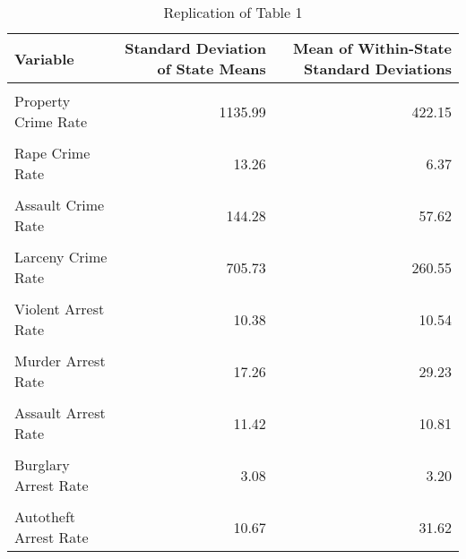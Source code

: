 \begin{table}[H]

\caption{\label{tab:tab:replicatetable2}Replication of Table 1}
\centering
\begin{tabular}[t]{lrr}
\toprule
Variable & Standard Deviation of State Means & Mean of Within-State Standard Deviations\\
\midrule
\cellcolor{gray!6}{Violent Crime Rate} & \cellcolor{gray!6}{306.62} & \cellcolor{gray!6}{78.19}\\
Property Crime Rate & 1135.99 & 422.15\\
\cellcolor{gray!6}{Murder Crime Rate} & \cellcolor{gray!6}{6.19} & \cellcolor{gray!6}{1.50}\\
Rape Crime Rate & 13.26 & 6.37\\
\cellcolor{gray!6}{Robbery Crime Rate} & \cellcolor{gray!6}{171.87} & \cellcolor{gray!6}{28.81}\\
\addlinespace
Assault Crime Rate & 144.28 & 57.62\\
\cellcolor{gray!6}{Burglary Crime Rate} & \cellcolor{gray!6}{372.52} & \cellcolor{gray!6}{181.39}\\
Larceny Crime Rate & 705.73 & 260.55\\
\cellcolor{gray!6}{Autotheft Crime Rate} & \cellcolor{gray!6}{210.57} & \cellcolor{gray!6}{82.24}\\
Violent Arrest Rate & 10.38 & 10.54\\
\addlinespace
\cellcolor{gray!6}{Property Arrest Rate} & \cellcolor{gray!6}{3.07} & \cellcolor{gray!6}{3.23}\\
Murder Arrest Rate & 17.26 & 29.23\\
\cellcolor{gray!6}{Rape Arrest Rate} & \cellcolor{gray!6}{11.15} & \cellcolor{gray!6}{10.65}\\
Assault Arrest Rate & 11.42 & 10.81\\
\cellcolor{gray!6}{Robery Arrest Rate} & \cellcolor{gray!6}{8.83} & \cellcolor{gray!6}{8.09}\\
\addlinespace
Burglary Arrest Rate & 3.08 & 3.20\\
\cellcolor{gray!6}{Larceny Arrest Rate} & \cellcolor{gray!6}{3.42} & \cellcolor{gray!6}{3.49}\\
Autotheft Arrest Rate & 10.67 & 31.62\\
\bottomrule
\end{tabular}
\end{table}
